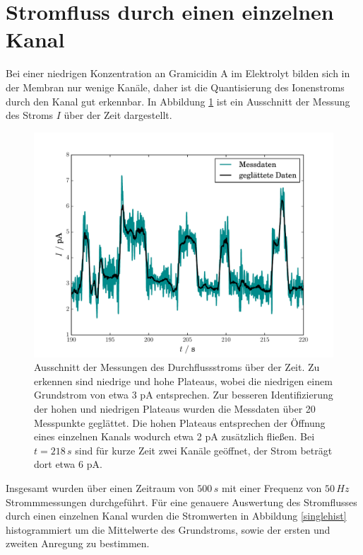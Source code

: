 \documentclass{include/thesisclass3}
\newcommand{\e}[1]{\,\si{#1}}
\begin{document}
\section{Stromfluss durch einen einzelnen Kanal}
Bei einer niedrigen Konzentration an Gramicidin A im Elektrolyt bilden sich in der Membran nur wenige Kanäle, daher ist die Quantisierung des Ionenstroms durch den Kanal gut erkennbar. In Abbildung \ref{singlechannel} ist ein Ausschnitt der Messung des Stroms $I$ über der Zeit dargestellt.
\begin{figure}[H]
\centering
\includegraphics[scale=0.7]{images/ssingle_channel.pdf}
\caption{Ausschnitt der Messungen des Durchflussstroms über der Zeit. Zu erkennen sind niedrige und hohe Plateaus, wobei die niedrigen einem Grundstrom von etwa 3 pA entsprechen. Zur besseren Identifizierung der hohen und niedrigen Plateaus wurden die Messdaten über 20 Messpunkte geglättet. Die hohen Plateaus entsprechen der Öffnung eines einzelnen Kanals wodurch etwa 2 pA zusätzlich fließen. Bei $t = 218\e{s}$ sind für kurze Zeit zwei Kanäle geöffnet, der Strom beträgt dort etwa 6 pA.}
\label{singlechannel}
\end{figure}
Insgesamt wurden über einen Zeitraum von $500\e{s}$ mit einer Frequenz von $50\e{Hz}$ Strommmessungen durchgeführt. Für eine genauere Auswertung des Stromflusses durch einen einzelnen Kanal wurden die Stromwerten in Abbildung \ref{singlehist} histogrammiert um die Mittelwerte des Grundstroms, sowie der ersten und zweiten Anregung zu bestimmen.
\end{document}
